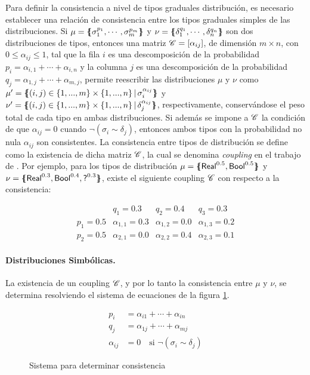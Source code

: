 Para definir la consistencia a nivel de tipos graduales distribución, es necesario establecer una relación de consistencia entre los tipos graduales  simples de las distribuciones. Si $\mu = \{\mskip-7mu\{ {\sigma_1^{p_1},\cdots,\sigma_m^{p_m}} \}\mskip-7mu\}$ y $\nu = \{\mskip-7mu\{ {\delta_1^{q_1},\cdots,\delta_n^{q_n}} \}\mskip-7mu\}$ son dos distribuciones de tipos, entonces una matriz  $\mathscr{C} = [\alpha_{ij}]$, de dimensión $m\times n$, con $0\leq\alpha_{ij}\leq 1$, tal que la fila $i$ es una descomposición de la probabilidad $p_i = \alpha_{i,1}+\cdots +\alpha_{i,n}$ y la columna $j$ es una descomposición de la probabilidad $q_j = \alpha_{1,j} + \cdots +\alpha_{m,j}$, permite reescribir las distribuciones $\mu$ y $\nu$ como  $\mu'= \{\mskip-7mu\{ {(i,j)\in\{1,...,m\}\times\{1,...,n\} \mathop{|} \sigma_i^{\alpha_{ij}}} \}\mskip-7mu\}$ y $\nu'= \{\mskip-7mu\{ {(i,j)\in\{1,...,m\}\times\{1,...,n\} \mathop{|} \delta_j^{\alpha_{ij}}} \}\mskip-7mu\}$, respectivamente, conservándose el peso total de cada tipo en ambas distribuciones. Si además se impone a $\mathscr{C}$ la condición de que $\alpha_{ij} = 0$ cuando $\neg(\sigma_i\sim \delta_j)$, entonces ambos tipos con la probabilidad no nula $\alpha_{ij}$ son consistentes. La consistencia entre tipos de distribución se define como la existencia de dicha matriz $\mathscr{C}$, la cual se denomina \emph{coupling} en el trabajo de \cite{gplc}. Por ejemplo, para los tipos de distribución $\mu=\{\mskip-7mu\{ {\mathord{\text{\sffamily Real}}^{0.5}, \mathord{\text{\sffamily Bool}}^{0.5}} \}\mskip-7mu\}$ y $\nu=\{\mskip-7mu\{ {\mathord{\text{\sffamily Real}}^{0.3},\mathord{\text{\sffamily Bool}}^{0.4},\mathord{\text{\sffamily ?}}^{0.3}} \}\mskip-7mu\}$, existe el siguiente coupling $\mathscr{C}$ con respecto a la consistencia:

\[
  \begin{array}{c|cccc}
    
    \phantom{e} & q_{1} = 0.3 & q_{2} = 0.4 & q_{3} = 0.3\\
    \hline
     p_{1} = 0.5 & \alpha_{1,1} = 0.3 & \alpha_{1,2} = 0.0 & \alpha_{1,3} = 0.2 \\
    p_{2} = 0.5 & \alpha_{2,1} = 0.0 & \alpha_{2,2} = 0.4 & \alpha_{2,3}  = 0.1
  \end{array}
\]


\paragraph{Distribuciones Simbólicas.}\label{par:symbolic} La existencia de un coupling $\mathscr{C}$, y por lo tanto la consistencia entre $\mu$ y $\nu$, se determina resolviendo el sistema de ecuaciones de la figura \ref{fig:coupling-eq}.
\begin{figure}[H]
\centering
\begin{align*}
  p_i &= \alpha_{i1}+\cdots+\alpha_{in}\\
  q_j &= \alpha_{1j}+\cdots+\alpha_{mj}\\
  \alpha_{ij} &= 0 \quad \text{si } \neg(\sigma_i \sim \delta_j)
\end{align*}
\caption{Sistema para determinar consistencia}
\label{fig:coupling-eq}
\end{figure}


